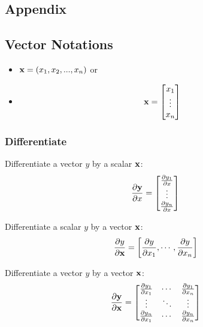 \renewcommand{\thesection}{\Alph{section}.\arabic{section}}
\setcounter{section}{0}

\begin{appendices}
\chapter{Appendix}

\section{Vector Notations}

\begin{itemize}
	\item ${\mathbf{x}} = (x_1, x_2,..., x_n)$ or
	\item 
		\begin{align*}
			{\mathbf{x}} = \begin{bmatrix}x_1\\ \vdots\\ x_n\end{bmatrix}
		\end{align*}
\end{itemize}

\subsection{Differentiate}

Differentiate a vector $y$ by a scalar ${\mathbf{x}}$:
\begin{align*}
	\frac{\partial {\mathbf{y}}}{\partial x} = \begin{bmatrix}\frac{\partial y_1}{\partial x}\\ \vdots\\ \frac{\partial y_n}{\partial x}\end{bmatrix}
\end{align*}

Differentiate a scalar $y$ by a vector ${\mathbf{x}}$:
\begin{align*}
	\frac{\partial y}{\partial {\mathbf{x}}} = \bigg[\frac{\partial y}{\partial x_1}, \cdots, \frac{\partial y}{\partial x_n}\bigg]
\end{align*}

Differentiate a vector $y$ by a vector ${\mathbf{x}}$:
\begin{align*}
	\frac{\partial {\mathbf{y}}}{\partial {\mathbf{x}}} = \begin{bmatrix}
		\frac{\partial y_1}{\partial x_1} & \cdots & \frac{\partial y_1}{\partial x_n}\\ 
		\vdots & \ddots & \vdots\\ 
		\frac{\partial y_n}{\partial x_1} & \cdots & \frac{\partial y_n}{\partial x_n}
\end{bmatrix}
\end{align*}


\end{appendices}
